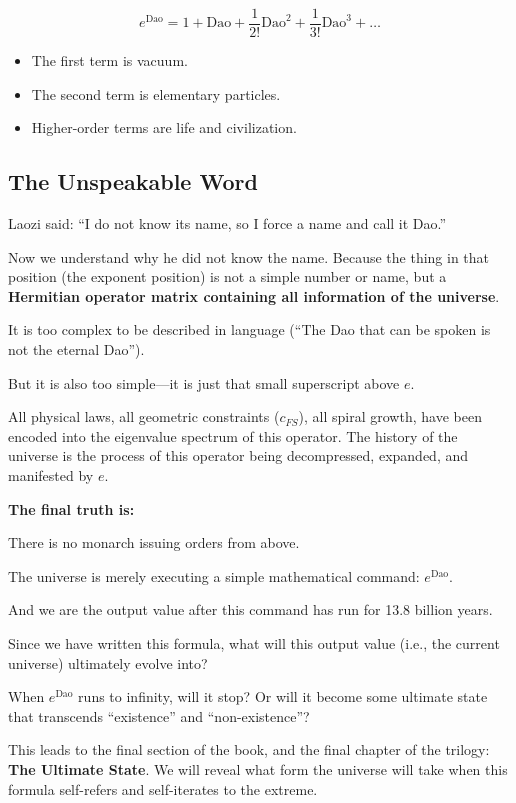 \documentclass[11pt,a4paper,twoside]{book}
\begin{document}
$$e^{\text{Dao}} = 1 + \text{Dao} + \frac{1}{2!}\text{Dao}^2 + \frac{1}{3!}\text{Dao}^3 + \dots$$

\begin{itemize}
\item The first term is vacuum.

\item The second term is elementary particles.

\item Higher-order terms are life and civilization.
\end{itemize}

\subsection{The Unspeakable Word}

Laozi said: ``I do not know its name, so I force a name and call it Dao.''

Now we understand why he did not know the name. Because the thing in that position (the exponent position) is not a simple number or name, but a \textbf{Hermitian operator matrix containing all information of the universe}.

It is too complex to be described in language (``The Dao that can be spoken is not the eternal Dao'').

But it is also too simple---it is just that small superscript above $e$.

All physical laws, all geometric constraints ($c_{FS}$), all spiral growth, have been encoded into the eigenvalue spectrum of this operator. The history of the universe is the process of this operator being decompressed, expanded, and manifested by $e$.

\textbf{The final truth is:}

There is no monarch issuing orders from above.

The universe is merely executing a simple mathematical command: \textbf{$e^{\text{Dao}}$}.

And we are the output value after this command has run for 13.8 billion years.

Since we have written this formula, what will this output value (i.e., the current universe) ultimately evolve into?

When $e^{\text{Dao}}$ runs to infinity, will it stop? Or will it become some ultimate state that transcends ``existence'' and ``non-existence''?

This leads to the final section of the book, and the final chapter of the trilogy: \textbf{The Ultimate State}. We will reveal what form the universe will take when this formula self-refers and self-iterates to the extreme.
\end{document}
